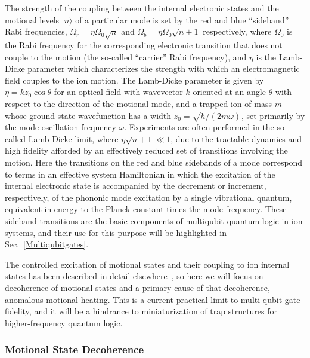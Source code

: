 \documentclass[%
12pt,
 amsmath,amssymb,
]{revtex4-2}
\begin{document}
The strength of the coupling between the internal electronic states and the motional levels $|n\rangle$ of a particular mode is set by the red and blue ``sideband'' Rabi frequencies, $\Omega_{r}=\eta \Omega_{0} \sqrt{n}$ and  $\Omega_{b}=\eta \Omega_{0} \sqrt{n+1}$ respectively, where $\Omega_{0}$ is the Rabi frequency for the corresponding electronic transition that does not couple to the motion (the so-called ``carrier'' Rabi frequency), and $\eta$ is the Lamb-Dicke parameter which characterizes the strength with which an electromagnetic field couples to the ion motion.  The Lamb-Dicke parameter is given by $\eta=k z_{0}\cos\theta$ for an optical field with wavevector $k$ oriented at an angle $\theta$ with respect to the direction of the motional mode, and a trapped-ion of mass $m$ whose ground-state wavefunction has a width $z_{0}=\sqrt{\hbar/(2 m \omega)}$, set primarily by the mode oscillation frequency $\omega$.  Experiments are often performed in the so-called Lamb-Dicke limit, where $\eta\sqrt{n+1}\ll 1$, due to the tractable dynamics and high fidelity afforded by an effectively reduced set of transitions involving the motion.  Here the transitions on the red and blue sidebands of a mode correspond to terms in an effective system Hamiltonian in which the excitation of the internal electronic state is accompanied by the decrement or increment, respectively, of the phononic mode excitation by a single vibrational quantum, equivalent in energy to the Planck constant times the mode frequency.  These sideband transitions are the basic components of multiqubit quantum logic in ion systems, and their use for this purpose will be highlighted in Sec.~\ref{Multiqubitgates}.

The controlled excitation of motional states and their coupling to ion internal states has been described in detail elsewhere~\cite{Wineland1998,leibfried2003quantum,ozeri_tutorial_2011}, so here we will focus on decoherence of motional states and a primary cause of that decoherence, anomalous motional heating.  This is a current practical limit to multi-qubit gate fidelity, and it will be a hindrance to miniaturization of trap structures for higher-frequency quantum logic.

\subsubsection{Motional State Decoherence}
\end{document}
